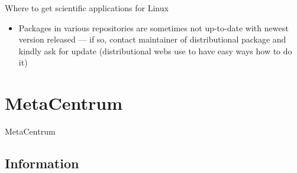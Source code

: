 \documentclass[compress, ucs, xelatex, 11pt, xcolor=svgnames, aspectratio=169,
	hyperref={
		bookmarks=true,
		unicode=true,
		colorlinks=true,
		pdftitle={Linux, command line and MetaCentrum},
		plainpages=false,
		pdfauthor={Vojtech Zeisek},
		pdfsubject={Course about use of Linux command line, writing shell scripts and using MetaCentrum of CESNET},
		pdfcreator={XeLaTeX},
		pdfkeywords={Linux, GNU, BASH, shell, command line, MetaCentrum},
		linkcolor=DarkRed, %
		anchorcolor=DarkBlue, %
		citecolor=Indigo, %
		filecolor=NavyBlue, %
		menucolor=DarkMagenta, %
		urlcolor=DarkBlue, %
		pdftex},
	url={hyphens, lowtilde} %
	]{beamer}
\begin{document}
\begin{frame}[allowframebreaks]{Where to get scientific applications for Linux}
\begin{itemize}
		\begin{itemize}
			\item Distributions sometimes provide packages at least for part of the packages of such languages --- typically at least for Python, Perl or R --- this is especially convenient for packages having plenty of complex dependencies
		\end{itemize}
		\item Packages in various repositories are sometimes not up-to-date with newest version released --- if so, contact maintainer of distributional package and kindly ask for update (distributional webs use to have easy ways how to do it)
	\end{itemize}
\end{frame}

\section{MetaCentrum}

\begin{frame}{MetaCentrum}
	\tableofcontents[currentsection, sectionstyle=show/hide, hideothersubsections]
\end{frame}

\subsection{Information}
\end{document}
